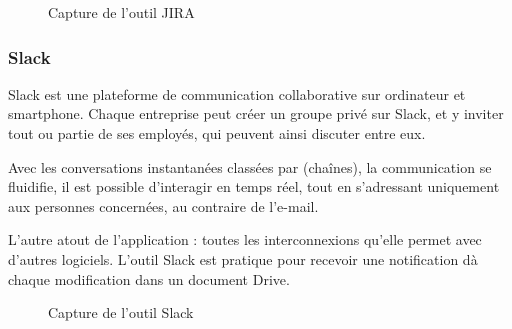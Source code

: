 \begin{figure}[H]
	\caption{\label{fig:my-label} Capture de l'outil JIRA}
\end{figure}

\subsubsection{Slack}

Slack est une plateforme de communication collaborative sur ordinateur et smartphone. Chaque entreprise peut cr\'eer un groupe priv\'e sur Slack, et y inviter tout ou partie de ses employ\'es, qui peuvent ainsi discuter entre eux.

Avec les conversations instantan\'ees class\'ees par (cha\^ines), la communication se fluidifie, il est possible d'interagir en temps r\'eel, tout en s'adressant uniquement aux personnes concern\'ees, au contraire de l'e-mail.

L'autre atout de l'application : toutes les interconnexions qu'elle permet avec d'autres logiciels. L'outil Slack est pratique pour recevoir une notification d\`a chaque modification dans un document Drive.

\begin{figure}[H]
	\caption{\label{fig:my-label} Capture de l'outil Slack}
\end{figure}


